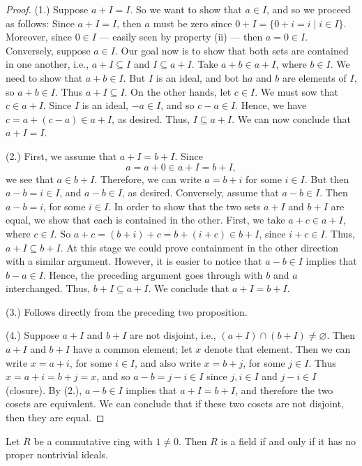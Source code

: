 \documentclass[graybox, reqno]{svmono}
\begin{document}
\begin{proof} (1.) Suppose $a+I = I$. So we want to show that $a \in I$, and so we proceed as follows: Since $a + I = I$, then $a$ must be zero since $0+I = \{ 0+ i = i \mid i \in I \}$. Moreover, since $0 \in I$ --- easily seen by property (ii) --- then $a= 0 \in I$. Conversely, suppose $a \in I$. Our goal now is to show that both sets are contained in one another, i.e., $a+I \subseteq I$ and $I \subseteq a + I$. Take $a + b \in a+ I$, where $b \in I$. We need to show that $a+ b \in I$. But $I$ is an ideal, and bot h$a$ and $b$ are elements of $I$, so $a+b \in I$. Thus $a+I \subseteq I$. On the other hands, let $c \in I$. We must sow that $c \in a +I$. Since $I$ is an ideal, $-a \in I$, and so $c-a \in I$. Hence, we have $c = a+ (c-a) \in a+I$, as desired. Thus, $I \subseteq a +I$. We can now conclude that $a+I =I$.

(2.) First, we assume that $a + I = b + I$. Since
\[ a = a + 0 \in a + I = b + I ,\]
we see that $a \in b + I$. Therefore, we can write $a = b + i$ for some $i \in I$. But then $a - b = i \in I$, and $a - b \in I$, as desired. Conversely, assume that $a - b \in I$. Then $a - b = i$, for some $i \in I$. In order to show that the two sets $a + I$ and $b + I$ are equal, we show that each is contained in the other. First, we take $a + c \in a + I$, where $c \in I$. So $a + c = (b + i) + c = b + (i + c) \in b + I$,
since $i + c \in I$. Thus, $a + I \subseteq b + I$. At this stage we could prove containment in the other direction with a similar argument. However, it is easier to notice that $a - b \in I$ implies that $b - a \in I$. Hence, the preceding argument goes through with $b$ and $a$ interchanged. Thus, $b + I \subseteq a + I$. We conclude that $a + I = b + I$. 

(3.) Follows directly from the preceding two proposition.

(4.) Suppose $a+I$ and $b+I$ are not disjoint, i.e., $(a+I) \cap (b+I) \neq \varnothing$. Then $a+ I$ and $b+I$ have a common element; let $x$ denote that element. Then we can write $x= a+i$, for some $i \in I$, and also write $x = b+j$, for some $j \in I$. Thus $x = a+i = b+j = x$, and so $a-b = j-i \in I $ since $j, i \in I$ and $j-i \in I$ (closure). By (2.), $a-b \in I$ implies that $a + I = b+I$, and therefore the two cosets are equivalent. We can conclude that if these two cosets are not disjoint, then they are equal.
\end{proof}
\begin{proposition} Let $R$ be a commutative ring with $1 \neq 0$. Then $R$ is a field if and only if it has no proper nontrivial ideals.
\end{proposition} 
\end{document}
